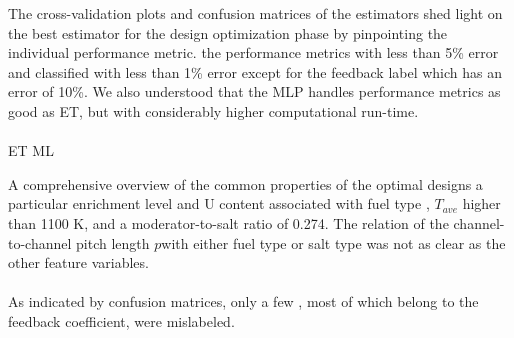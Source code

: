     \DIFaddend The cross-validation plots and confusion matrices of the \DIFdelbegin {}\DIFdelend \DIFaddbegin {}\DIFaddend estimators shed light on the best estimator for the design optimization phase by pinpointing the individual performance metric. \DIFdelbegin {}\DIFdelend \DIFaddbegin {}\DIFaddend the performance metrics \DIFdelbegin {}\DIFdelend with less than 5\% error and classified with less than 1\% error except for the feedback label which has an error of 10\%. We also understood that the \gls{MLP} handles performance metrics as good as \gls{ET}, but with considerably higher computational run-time. \DIFdelbegin \paragraph{} %
\addtocounter{paragraph}{-1}%
\DIFdelend \DIFaddbegin {}\gls{ET} \gls{ML} 

    \DIFaddend A comprehensive overview of the common properties of the optimal designs \DIFdelbegin {}\DIFdelend \DIFaddbegin {}\DIFaddend a particular enrichment level and U content	associated with fuel type \DIFdelbegin {}\DIFdelend \DIFaddbegin {}\DIFaddend , $T_{ave}$ higher than 1100 K, and a moderator-to-salt ratio of 0.274. The relation of the channel-to-channel pitch length \DIFdelbegin \DIFdel{, }\DIFdelend \DIFaddbegin \DIFadd{(}\DIFaddend $p$\DIFdelbegin \DIFdel{, }\DIFdelend \DIFaddbegin \DIFadd{) }\DIFaddend with either fuel type or salt type was not as clear as the other feature variables.
\DIFdelbegin \paragraph{}
\addtocounter{paragraph}{-1}%
\DIFdelend \DIFaddbegin 

    \DIFaddend As indicated by confusion matrices, only a few \DIFaddbegin {}\DIFaddend , most of which belong to the feedback coefficient, were mislabeled.
\DIFdelbegin \paragraph{} %
\addtocounter{paragraph}{-1}%
\DIFdelend \DIFaddbegin 

